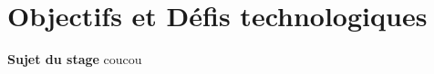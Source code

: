 \section{Objectifs et Défis technologiques}
\begin{frame}
\textbf{Sujet du stage}
coucou
\end{frame}
